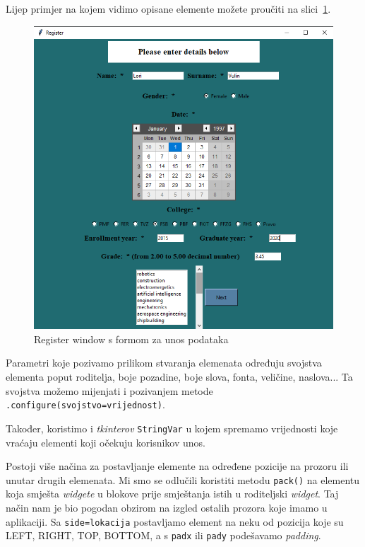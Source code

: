 \documentclass[titlepage, 12pt]{scrartcl}
\begin{document}
	
	Lijep primjer na kojem vidimo opisane elemente možete proučiti na slici~\ref{fig:forma}.
	
	\begin{figure}[h]
		\begin{center}
			\includegraphics[scale = 0.7]{slike/forma.png}
			\caption{Register window s formom za unos podataka}
			\label{fig:forma} 
		\end{center}
	\end{figure}
	
	
	Parametri koje pozivamo prilikom stvaranja elemenata određuju svojstva elementa poput roditelja, boje pozadine, boje slova, fonta, veličine, naslova... Ta svojstva možemo mijenjati i pozivanjem metode \texttt{.configure(svojstvo=vrijednost)}.
	
	Također, koristimo i \emph{tkinterov} \texttt{StringVar} u kojem spremamo vrijednosti koje vraćaju elementi koji očekuju korisnikov unos. 
	
	Postoji više načina za postavljanje elemente na određene pozicije na prozoru ili unutar drugih elemenata. Mi smo se odlučili koristiti metodu \texttt{pack()} na elementu koja smješta \emph{widgete} u blokove prije smještanja istih u roditeljski \emph{widget}. Taj način nam je bio pogodan obzirom na izgled ostalih prozora koje imamo u aplikaciji. Sa \texttt{side=lokacija} postavljamo element na neku od pozicija koje su LEFT, RIGHT, TOP, BOTTOM, a s \texttt{padx} ili \texttt{pady} podešavamo \emph{padding}. 
	
\end{document}
